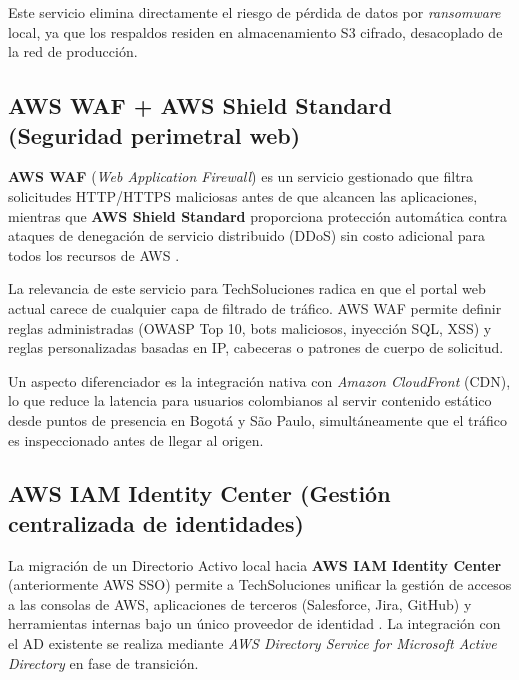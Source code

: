 \documentclass[12pt, a4paper]{article}
\begin{document}
Este servicio elimina directamente el riesgo de pérdida de datos por \textit{ransomware} local, ya que los respaldos residen en almacenamiento S3 cifrado, desacoplado de la red de producción.

\subsection{AWS WAF + AWS Shield Standard (Seguridad perimetral web)}

\textbf{AWS WAF} (\textit{Web Application Firewall}) es un servicio gestionado que filtra solicitudes HTTP/HTTPS maliciosas antes de que alcancen las aplicaciones, mientras que \textbf{AWS Shield Standard} proporciona protección automática contra ataques de denegación de servicio distribuido (DDoS) sin costo adicional para todos los recursos de AWS \autocite{AWS2024WAF}.

La relevancia de este servicio para TechSoluciones radica en que el portal web actual carece de cualquier capa de filtrado de tráfico. AWS WAF permite definir reglas administradas (OWASP Top 10, bots maliciosos, inyección SQL, XSS) y reglas personalizadas basadas en IP, cabeceras o patrones de cuerpo de solicitud.

Un aspecto diferenciador es la integración nativa con \textit{Amazon CloudFront} (CDN), lo que reduce la latencia para usuarios colombianos al servir contenido estático desde puntos de presencia en Bogotá y São Paulo, simultáneamente que el tráfico es inspeccionado antes de llegar al origen.

\subsection{AWS IAM Identity Center (Gestión centralizada de identidades)}

La migración de un Directorio Activo local hacia \textbf{AWS IAM Identity Center} (anteriormente AWS SSO) permite a TechSoluciones unificar la gestión de accesos a las consolas de AWS, aplicaciones de terceros (Salesforce, Jira, GitHub) y herramientas internas bajo un único proveedor de identidad \autocite{AWS2024IAM}. La integración con el AD existente se realiza mediante \textit{AWS Directory Service for Microsoft Active Directory} en fase de transición.
\end{document}
